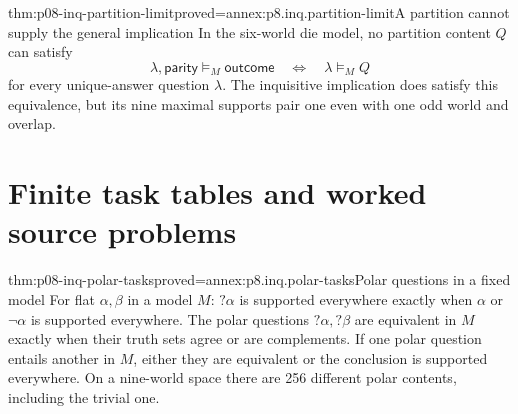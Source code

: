 \begin{hbtheorem}{thm:p08-inq-partition-limit}{proved=annex:p8.inq.partition-limit}{A partition cannot supply the general implication}
In the six-world die model, no partition content \(Q\) can satisfy
\[
 \lambda,\mathsf{parity}\models_M\mathsf{outcome}
 \quad\Longleftrightarrow\quad \lambda\models_M Q
\]
for every unique-answer question \(\lambda\). The inquisitive implication
does satisfy this equivalence, but its nine maximal supports pair one even
with one odd world and overlap.
\end{hbtheorem}

\section{Finite task tables and worked source problems}

\begin{hbtheorem}{thm:p08-inq-polar-tasks}{proved=annex:p8.inq.polar-tasks}{Polar questions in a fixed model}
For flat \(\alpha,\beta\) in a model \(M\): \(?\alpha\) is supported
everywhere exactly when \(\alpha\) or \(\neg\alpha\) is supported everywhere.
The polar questions \(?\alpha,?\beta\) are equivalent in \(M\) exactly
when their truth sets agree or are complements. If one polar question
entails another in \(M\), either they are equivalent or the conclusion
is supported everywhere. On a nine-world space there are 256 different
polar contents, including the trivial one.
\end{hbtheorem}

